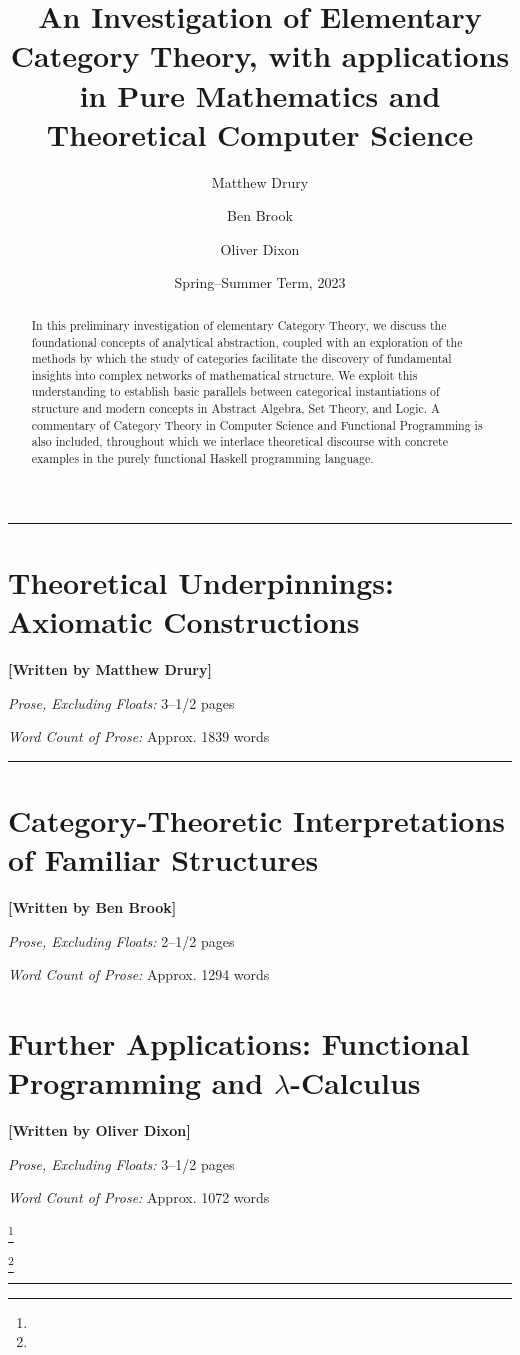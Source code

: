 \documentclass[10pt,a4paper,reqno]{amsart}
\title[\plainshorttitle]{An Investigation of Elementary Category Theory, with %
        applications in Pure Mathematics and Theoretical Computer Science}
\author{Matthew Drury} \email{\yorkemail{md1499}}
\author{Ben Brook}     \email{\yorkemail{bb1170}}
\author{Oliver Dixon}  \email{\yorkemail{od641}}
\date{Spring--Summer Term, 2023}
\numberwithin{equation}{section} %
\numberwithin{listing}{section}  %
\numberwithin{figure}{section}   %
\renewcommand{\footrulewidth}{.3pt}
\renewcommand{\headrulewidth}{\footrulewidth}
\renewcommand{\headrulewidth}{0pt}
\newcommand\anonfootnote[1]{%
        \begingroup
        \renewcommand\thefootnote{}\footnote{#1}%
        \addtocounter{footnote}{-1}%
        \endgroup
}
\newcommand{\startcontribution}[5]{%
        \section{\for{toc}{\texorpdfstring{\textbf{[#1]~}}{}}#3}
        \begin{flushright}
                \vspace{5pt}
                \textbf{[Written by #2]}

                \vspace{5pt}
                \textit{Prose, Excluding Floats:} #4 pages

                \textit{Word Count of Prose:} Approx. #5 words
        \end{flushright}
}
\begin{document}
\thispagestyle{firstpage}
\pagestyle{fancy}
\begin{abstract}
        In this preliminary investigation of elementary Category Theory, we
        discuss the foundational concepts of analytical abstraction, coupled
        with an exploration of the methods by which the study of categories
        facilitate the discovery of fundamental insights into complex networks
        of mathematical structure. We exploit this understanding to establish
        basic parallels between categorical instantiations of structure and
        modern concepts in Abstract Algebra, Set Theory, and Logic. A commentary
        of Category Theory in Computer Science and Functional Programming is
        also included, throughout which we interlace theoretical discourse with
        concrete examples in the purely functional Haskell programming language.
\end{abstract}
\maketitle
\tableofcontents
\vspace{-1.5\belowcaptionskip}
\par\noindent\rule{\textwidth}{\headrulewidth}
\vspace{.15em}
\startcontribution{MD}{Matthew Drury}%
        {Theoretical Underpinnings: Axiomatic Constructions}%
        {3--1/2}{1839} %

\vspace{\belowcaptionskip}
\par\noindent\rule{\textwidth}{\headrulewidth}
\vspace{-.15em}

\startcontribution{BB}{Ben Brook}%
        {Category-Theoretic Interpretations of Familiar Structures}%
        {2--1/2}{1294} %

\clearpage
\startcontribution{OD}{Oliver Dixon}%
        {Further Applications: Functional Programming and %
                \texorpdfstring{$\lambda$}{Lambda}-Calculus}%
        {3--1/2}{1072} %
\label{sec:funcprog}

\anonfootnote{\vspace{-.5em}}
\anonfootnote{%
        \raggedleft%
        \color{darkgray}{%
                [\hypersetup{linkcolor=darkgray}%
                \autoref{sec:funcprog}~is wholly dedicated to \textit{MQ}.]%
        }%
        \vspace{-\baselineskip} %
}

\par\noindent\rule{\textwidth}{\headrulewidth}
\vspace{-.5\baselineskip}
\printbibliography[title=Cited Works]
\renewcommand{\footnoterule}{}
\end{document}
